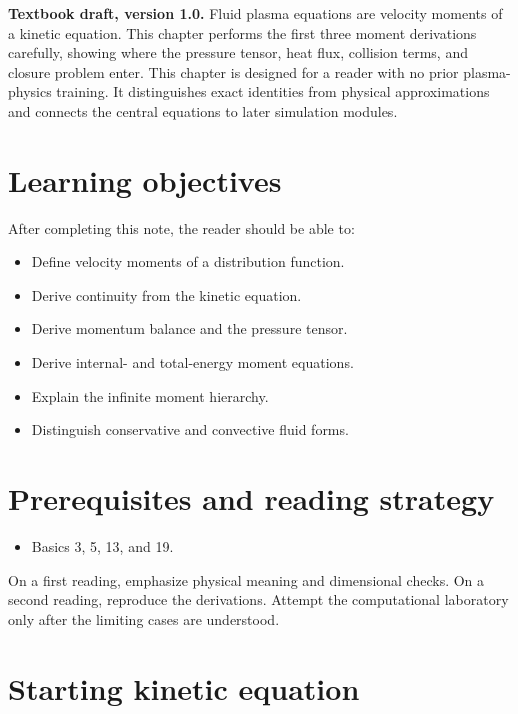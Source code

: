 \documentclass[11pt]{article}
\begin{document}

\begin{overviewbox}
\textbf{Textbook draft, version 1.0.} Fluid plasma equations are velocity moments of a kinetic equation. This chapter performs the first three moment derivations carefully, showing where the pressure tensor, heat flux, collision terms, and closure problem enter. This chapter is designed for a reader with no prior plasma-physics training. It distinguishes exact identities from physical approximations and connects the central equations to later simulation modules.
\end{overviewbox}

\ProjectTOC

\section{Learning objectives}
After completing this note, the reader should be able to:
\begin{itemize}[leftmargin=1.6em]
\item Define velocity moments of a distribution function.
\item Derive continuity from the kinetic equation.
\item Derive momentum balance and the pressure tensor.
\item Derive internal- and total-energy moment equations.
\item Explain the infinite moment hierarchy.
\item Distinguish conservative and convective fluid forms.
\end{itemize}

\section{Prerequisites and reading strategy}
\begin{itemize}[leftmargin=1.6em]
\item Basics 3, 5, 13, and 19.
\end{itemize}
On a first reading, emphasize physical meaning and dimensional checks. On a second reading, reproduce the derivations. Attempt the computational laboratory only after the limiting cases are understood.

\section{Starting kinetic equation}
\end{document}
